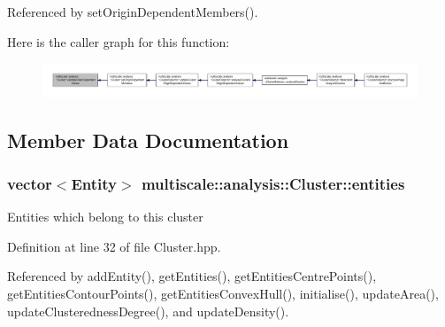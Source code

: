 Referenced by set\-Origin\-Dependent\-Members().



Here is the caller graph for this function\-:\nopagebreak
\begin{figure}[H]
\begin{center}
\leavevmode
\includegraphics[width=350pt]{classmultiscale_1_1analysis_1_1Cluster_a26b9c11e63bfdbfc837a35f68c5c40dd_icgraph}
\end{center}
\end{figure}




\subsection{Member Data Documentation}
\hypertarget{classmultiscale_1_1analysis_1_1Cluster_a820298479651328fb79d92a65f7923d6}{
\subsubsection[{entities}]{\setlength{\rightskip}{0pt plus 5cm}vector$<${\bf Entity}$>$ multiscale\-::analysis\-::\-Cluster\-::entities\hspace{0.3cm}{\ttfamily [private]}}}\label{classmultiscale_1_1analysis_1_1Cluster_a820298479651328fb79d92a65f7923d6}
Entities which belong to this cluster 

Definition at line 32 of file Cluster.\-hpp.



Referenced by add\-Entity(), get\-Entities(), get\-Entities\-Centre\-Points(), get\-Entities\-Contour\-Points(), get\-Entities\-Convex\-Hull(), initialise(), update\-Area(), update\-Clusteredness\-Degree(), and update\-Density().


